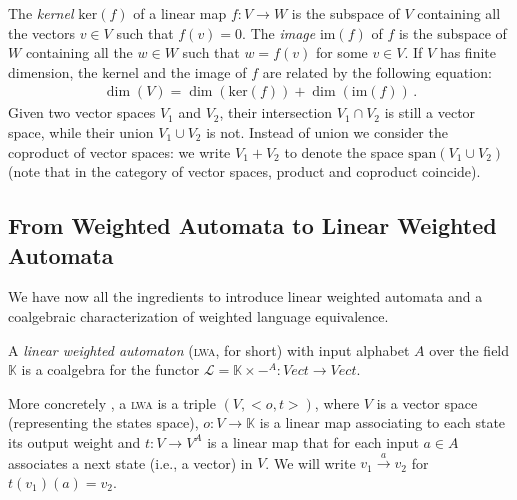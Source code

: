 \documentclass[3p]{elsarticle}
\def\tr#1{\stackrel{#1}{\to}}          %
\newcommand{\fL}{\mathcal{L}}    %
\newcommand{\vectproduct}{\times} %
\newcommand{\image}{\mathrm{im}} %
\newcommand{\K}{\mathbb{K}}            %
\newcommand{\kernel}{\mathrm{ker}} %
\newcommand{\Span}{\mathrm{span}}  %
\newcommand{\mik}[1]{\marginpar{ \textbf{MiB:} {\footnotesize #1}}} %
\begin{document}
\medskip

The \emph{kernel} $\kernel(f)$ of a linear map $f\colon V \to W$ is
the subspace of $V$ containing all the vectors $v\in V$ such that
$f(v)=0$. The \emph{image} $\image(f)$ of $f$ is the subspace of $W$
containing all the $w\in W$ such that $w=f(v)$ for some $v\in V$.
If $V$ has finite dimension, the kernel and the image of $f$ are related by the following
equation:
\begin{eqnarray}\label{Eq:FunLin}
\dim(V)=\dim(\kernel(f))+\dim(\image(f))\,.
\end{eqnarray}
Given two vector spaces $V_1$ and $V_2$, their intersection $V_1
\cap V_2$ is still a vector space, while their union $V_1\cup V_2$
is not. Instead of union we consider the coproduct of vector spaces:
we write $V_1+V_2$ to denote the space $\Span(V_1\cup
V_2)$ (note that in the category of vector spaces, product and
coproduct coincide).



\subsection{From Weighted Automata to Linear Weighted Automata}\label{sec:fromlatolwa}
%
We have now all the ingredients to introduce linear weighted
automata and a coalgebraic characterization of weighted language
equivalence.

\begin{definition}\label{def:lwa}
A \emph{linear weighted automaton} (\textsc{lwa}, for
short) with input alphabet $A$ over the field $\K$ is a coalgebra
for the functor $\fL=\K \vectproduct -^A\colon Vect \to Vect$.
\end{definition}

More
concretely \cite{Bor09}, a \textsc{lwa} is a triple $(V,<o,t>)$, where $V$ is a
vector space (representing the states space), $o\colon V \to \K$ is
a linear map associating to each state its output weight and
$t\colon V \to V^A$ is a linear map that for each input $a\in A$
associates a next state (i.e., a vector) in $V$. We will write $v_1
\tr{a} v_2$ for $t(v_1)(a)=v_2$.
\end{document}
